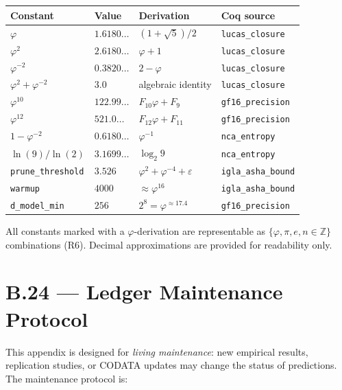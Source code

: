 \begin{center}
\begin{tabular}{p{3cm}p{1.8cm}p{4.5cm}p{2cm}}
\hline
\textbf{Constant} & \textbf{Value} & \textbf{Derivation} & \textbf{Coq source} \\
\hline
$\varphi$ & $1.6180\ldots$ & $(1+\sqrt{5})/2$ &
  \texttt{lucas\_closure} \\
$\varphi^{2}$ & $2.6180\ldots$ & $\varphi + 1$ &
  \texttt{lucas\_closure} \\
$\varphi^{-2}$ & $0.3820\ldots$ & $2 - \varphi$ &
  \texttt{lucas\_closure} \\
$\varphi^{2}+\varphi^{-2}$ & $3.0$ & algebraic identity &
  \texttt{lucas\_closure} \\
$\varphi^{10}$ & $122.99\ldots$ & $F_{10}\varphi + F_9$ &
  \texttt{gf16\_precision} \\
$\varphi^{12}$ & $521.0\ldots$ & $F_{12}\varphi + F_{11}$ &
  \texttt{gf16\_precision} \\
$1-\varphi^{-2}$ & $0.6180\ldots$ & $\varphi^{-1}$ &
  \texttt{nca\_entropy} \\
$\ln(9)/\ln(2)$ & $3.1699\ldots$ & $\log_2 9$ &
  \texttt{nca\_entropy} \\
\texttt{prune\_threshold} & $3.526$ & $\varphi^2+\varphi^{-4}+\varepsilon$ &
  \texttt{igla\_asha\_bound} \\
\texttt{warmup} & $4000$ & $\approx \varphi^{16}$ &
  \texttt{igla\_asha\_bound} \\
\texttt{d\_model\_min} & $256$ & $2^8 = \varphi^{\approx 17.4}$ &
  \texttt{gf16\_precision} \\
\hline
\end{tabular}
\end{center}

\noindent All constants marked with a $\varphi$-derivation are representable
as $\{φ, π, e, n \in \mathbb{Z}\}$ combinations (R6).  Decimal approximations
are provided for readability only.

\section*{B.24 — Ledger Maintenance Protocol}
\label{sec:maintenance}

\noindent This appendix is designed for \emph{living maintenance}: new empirical
results, replication studies, or CODATA updates may change the status of
predictions.  The maintenance protocol is:

